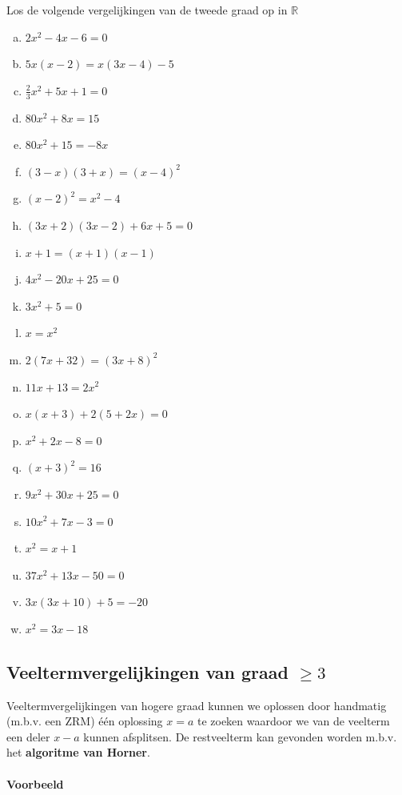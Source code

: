 \documentclass[12pt]{article}
\begin{document}
\begin{oefening}
Los de volgende vergelijkingen van de tweede graad op in $\mathbb{R}$
\begin{enumerate}[(a)]
  \itemsep0.7em
  \item $2x^2-4x-6=0$
  \item $5x(x-2)=x(3x-4)-5$
  \item $\frac{2}{3}x^2+5x+1=0$
  \item $80x^2+8x=15$
  \item $80x^2+15=-8x$
  \item $(3-x)(3+x)=(x-4)^2$
  \item $(x-2)^2=x^2-4$
  \item $(3x+2)(3x-2)+6x+5=0$
  \item $x+1=(x+1)(x-1)$
  \item $4x^2-20x+25=0$
  \item $3x^2+5=0$
  \item $x=x^2$
  \item $2\left(7x+32\right)=(3x+8)^2$
  \item $11x+13=2x^2$
  \item $x\left(x+3\right)+2\left(5+2x\right)=0$
  \item $x^2+2x-8=0$
  \item $(x+3)^2=16$
  \item $9x^2+30x+25=0$
  \item $10x^2+7x-3=0$
  \item $x^2=x+1$
  \item $37x^2+13x-50=0$
  \item $3x(3x+10)+5=-20$
  \item $x^2=3x-18$
\end{enumerate}
\end{oefening}

\pagebreak
\subsection{Veeltermvergelijkingen van graad $\geq 3$}

Veeltermvergelijkingen van hogere graad kunnen we oplossen door handmatig (m.b.v. een ZRM) één oplossing $x=a$ te zoeken waardoor we van de veelterm een deler $x-a$ kunnen afsplitsen. De restveelterm kan gevonden worden m.b.v. het {\bf algoritme van Horner}.

\paragraph{Voorbeeld}
\end{document}
